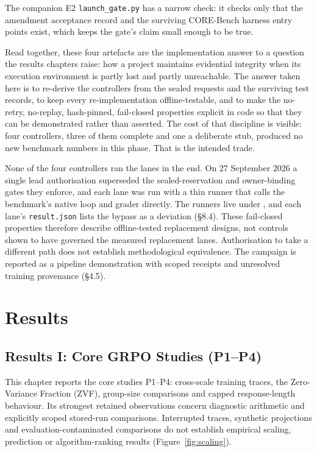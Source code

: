 \documentclass[12pt,a4paper]{report}
\DeclareRobustCommand{\longtok}[1]{\texttt{\seqsplit{#1}}}
\begin{document}
The companion E2 \texttt{launch\_gate.py} has a narrow check: it checks
only that the amendment acceptance record and the surviving CORE-Bench
harness entry points exist, which keeps the gate's claim small enough to
be true.

Read together, these four artefacts are the implementation answer to a
question the results chapters raise: how a project maintains evidential
integrity when its execution environment is partly lost and partly
unreachable. The answer taken here is to re-derive the controllers from
the sealed requests and the surviving test records, to keep every
re-implementation offline-testable, and to make the no-retry, no-replay,
hash-pinned, fail-closed properties explicit in code so that they can be
demonstrated rather than asserted. The cost of that discipline is
visible: four controllers, three of them complete and one a deliberate
stub, produced no new benchmark numbers in this phase. That is the
intended trade.

None of the four controllers ran the lanes in the end. On 27 September
2026 a single lead authorisation superseded the sealed-reservation and
owner-binding gates they enforce, and each lane was run with a thin
runner that calls the benchmark's native loop and grader directly. The
runners live under
\longtok{outputs/finish\_\allowbreak{}pending\_\allowbreak{}2026-09-27/\textless{}lane\textgreater{}/code/},
and each lane's \texttt{result.json} lists the bypass as a deviation
(§8.4). These fail-closed properties therefore describe offline-tested
replacement designs, not controls shown to have governed the measured
replacement lanes. Authorisation to take a different path does not
establish methodological equivalence. The campaign is reported as a
pipeline demonstration with scoped receipts and unresolved training
provenance (§4.5).



\part{Results}


\chapter{Results I: Core GRPO Studies
(P1--P4)}\label{results-i-core-grpo-studies-p1p4}

This chapter reports the core studies P1--P4: cross-scale training
traces, the Zero-Variance Fraction (ZVF), group-size comparisons and
capped response-length behaviour. Its strongest retained observations
concern diagnostic arithmetic and explicitly scoped stored-run
comparisons. Interrupted traces, synthetic projections and
evaluation-contaminated comparisons do not establish empirical scaling,
prediction or algorithm-ranking results (Figure~\ref{fig:scaling}).
\end{document}
